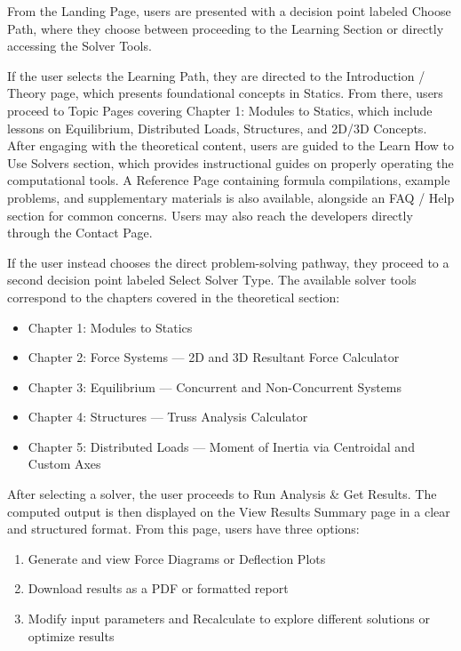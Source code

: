 From the Landing Page, users are presented with a decision point 
labeled Choose Path, where they choose between proceeding to the 
Learning Section or directly accessing the Solver Tools.

If the user selects the Learning Path, they are directed to the 
Introduction / Theory page, which presents foundational concepts in 
Statics. From there, users proceed to Topic Pages covering Chapter 1: 
Modules to Statics, which include lessons on Equilibrium, Distributed 
Loads, Structures, and 2D/3D Concepts. After engaging with the 
theoretical content, users are guided to the Learn How to Use Solvers 
section, which provides instructional guides on properly operating the 
computational tools. A Reference Page containing formula compilations, 
example problems, and supplementary materials is also available, 
alongside an FAQ / Help section for common concerns. Users may also 
reach the developers directly through the Contact Page.

If the user instead chooses the direct problem-solving pathway, they 
proceed to a second decision point labeled Select Solver Type. The 
available solver tools correspond to the chapters covered in the 
theoretical section:

\begin{itemize}
    \item Chapter 1: Modules to Statics
    \item Chapter 2: Force Systems --- 2D and 3D Resultant Force 
    Calculator
    \item Chapter 3: Equilibrium --- Concurrent and Non-Concurrent 
    Systems
    \item Chapter 4: Structures --- Truss Analysis Calculator
    \item Chapter 5: Distributed Loads --- Moment of Inertia via 
    Centroidal and Custom Axes
\end{itemize}

After selecting a solver, the user proceeds to Run Analysis \& Get 
Results. The computed output is then displayed on the View Results 
Summary page in a clear and structured format. From this page, users 
have three options:

\begin{enumerate}
    \item Generate and view Force Diagrams or Deflection Plots
    \item Download results as a PDF or formatted report
    \item Modify input parameters and Recalculate to explore different 
    solutions or optimize results
\end{enumerate}

